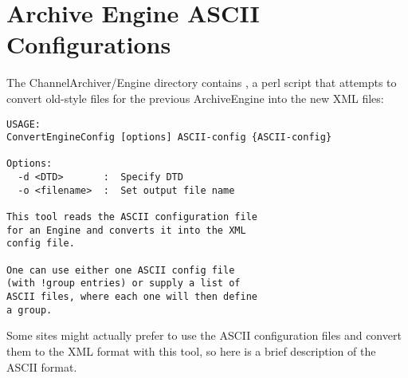 \section{Archive Engine ASCII Configurations} \label{sec:ASCIIConfig}
The ChannelArchiver/Engine directory contains ,
a perl script that attempts to convert old-style 
files for the previous ArchiveEngine into the new XML files:
\begin{lstlisting}[keywordstyle=\sffamily]
USAGE:
ConvertEngineConfig [options] ASCII-config {ASCII-config}
 
Options:
  -d <DTD>       :  Specify DTD
  -o <filename>  :  Set output file name
 
This tool reads the ASCII configuration file
for an Engine and converts it into the XML
config file.
 
One can use either one ASCII config file
(with !group entries) or supply a list of
ASCII files, where each one will then define
a group.
\end{lstlisting}

\noindent Some sites might actually prefer to use the ASCII
configuration files and convert them to the XML format with this tool,
so here is a brief description of the ASCII format.

